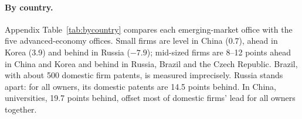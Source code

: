 \paragraph{By country.} Appendix Table~\ref{tab:bycountry} compares each emerging-market office with the five
advanced-economy offices. Small firms are level in China (0.7), ahead in Korea (3.9) and behind in Russia ($-7.9$); mid-sized firms are 8--12
points ahead in China and Korea and behind in Russia, Brazil and the Czech Republic. Brazil, with about 500 domestic
firm patents, is measured imprecisely. Russia stands apart: for all owners, its domestic patents are 14.5 points behind. In China, universities, 19.7
points behind, offset most of domestic firms' lead for all owners together.
